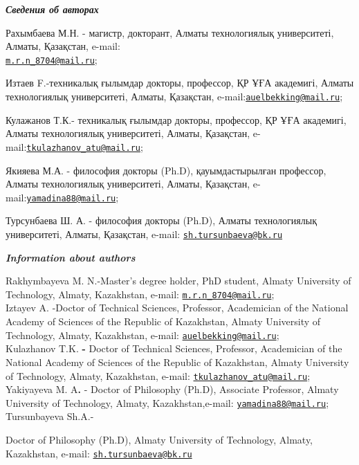 \begin{authorinfo}
\emph{{\bfseries Сведения об авторах}}

Рахымбаева М.Н. - магистр, докторант, Алматы технологиялық университеті,
Алматы, Қазақстан, e-mail:\\
\href{mailto:m.r.n_8704@mail.ru}{\nolinkurl{m.r.n\_8704@mail.ru}};

Изтаев F.-техникалық ғылымдар докторы, профессор, ҚР ҰҒА академигі,
Алматы технологиялық университеті, Алматы, Қазақстан,
e-mail:\href{mailto:auelbekking@mail.ru}{\nolinkurl{auelbekking@mail.ru}};

Кулажанов Т.К.- техникалық ғылымдар докторы, профессор, ҚР ҰҒА
академигі, Алматы технологиялық университеті, Алматы, Қазақстан,
e-mail:\href{mailto:tkulazhanov_atu@mail.ru}{\nolinkurl{tkulazhanov\_atu@mail.ru}};

Якияева М.А. - философия докторы (Ph.D), қауымдастырылған профессор,
Алматы технологиялық университеті, Алматы, Қазақстан,
e-mail:\href{mailto:yamadina88@mail.ru}{\nolinkurl{yamadina88@mail.ru}};

Турсунбаева Ш. А. - философия докторы (Ph.D), Алматы технологиялық
университеті, Алматы, Қазақстан, e-mail:
\href{mailto:sh.tursunbaeva@bk.ru}{\nolinkurl{sh.tursunbaeva@bk.ru}}

\emph{{\bfseries Information about authors}}

Rakhymbayeva M. N.-Master's degree holder, PhD student, Almaty
University of Technology, Almaty, Kazakhstan, e-mail:
\href{mailto:m.r.n_8704@mail.ru}{\nolinkurl{m.r.n\_8704@mail.ru}};\\
Iztayev A. -Doctor of Technical Sciences, Professor, Academician of the
National Academy of Sciences of the Republic of Kazakhstan, Almaty
University of Technology, Almaty, Kazakhstan, e-mail:
\href{mailto:auelbekking@mail.ru}{\nolinkurl{auelbekking@mail.ru}};\\
Kulazhanov T.K. {\bfseries -} Doctor of Technical Sciences, Professor,
Academician of the National Academy of Sciences of the Republic of
Kazakhstan, Almaty University of Technology, Almaty, Kazakhstan, e-mail:
\href{mailto:tkulazhanov_atu@mail.ru}{\nolinkurl{tkulazhanov\_atu@mail.ru}};\\
Yakiyayeva M. A{\bfseries .} - Doctor of Philosophy (Ph.D), Associate
Professor, Almaty University of Technology, Almaty, Kazakhstan,e-mail:
\href{mailto:yamadina88@mail.ru}{\nolinkurl{yamadina88@mail.ru}};\\
Tursunbayeva Sh.A.-

Doctor of Philosophy (Ph.D), Almaty University of Technology, Almaty,
Kazakhstan, e-mail:
\href{mailto:sh.tursunbaeva@bk.ru}{\nolinkurl{sh.tursunbaeva@bk.ru}}
\end{authorinfo}
